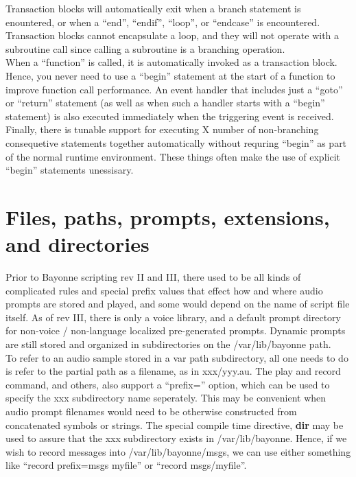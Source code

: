 \documentclass[a4paper,12pt]{article}
\begin{document}
Transaction blocks will automatically exit when a branch statement is 
enountered, or when a ``end'', ``endif'', ``loop'', or ``endcase'' is 
encountered.  Transaction blocks cannot encapsulate a loop, and they will 
not operate with a subroutine call since calling a subroutine is a 
branching operation. \\

When a ``function'' is called, it is automatically invoked as a
transaction block.  Hence, you never need to use a ``begin'' statement
at the start of a function to improve function call performance.  An
event handler that includes just a ``goto'' or ``return'' statement (as
well as when such a handler starts with a ``begin'' statement) is also
executed immediately when the triggering event is received.  Finally,
there is tunable support for executing X number of non-branching
consequetive statements together automatically without requring
``begin'' as part of the normal runtime environment.  These things often
make the use of explicit ``begin'' statements unessisary. \\

\section{Files, paths, prompts, extensions, and directories}

Prior to Bayonne scripting rev II and III, there used to be all kinds of 
complicated rules and special prefix values that effect how and where
audio prompts are stored and played, and some would depend on the name 
of script file itself.  As of rev III, there is only a voice library, and 
a default prompt directory for non-voice / non-language localized 
pre-generated prompts.  Dynamic prompts are still stored and 
organized in subdirectories on the /var/lib/bayonne path.  \\

To refer to an audio sample stored in a var path subdirectory, all one
needs to do is refer to the partial path as a filename, as in
xxx/yyy.au.  The play and record command, and others, also support a
``prefix='' option, which can be used to specify the xxx subdirectory
name seperately.  This may be convenient when audio prompt filenames
would need to be otherwise constructed from concatenated symbols or
strings.  The special compile time directive, {\bf dir} may be used to
assure that the xxx subdirectory exists in /var/lib/bayonne.  Hence, if
we wish to record messages into /var/lib/bayonne/msgs, we can use either
something like ``record prefix=msgs myfile'' or ``record msgs/myfile''. \\
\end{document}
